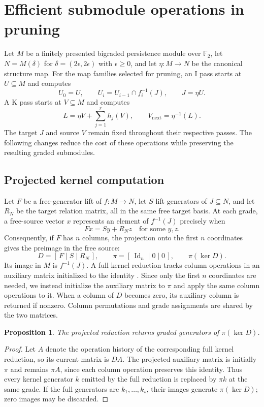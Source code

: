 \documentclass[11pt,a4paper]{article}
\newtheorem{proposition}{Proposition}
\newcommand{\F}{\mathbb F_2}
\newcommand{\Id}{\operatorname{Id}}
\begin{document}
\section{Efficient submodule operations in pruning}
Let $M$ be a finitely presented bigraded persistence module over $\F$, let
$N=M(\delta)$ for $\delta=(2\epsilon,2\epsilon)$ with $\epsilon\ge0$, and let $\eta:M\to N$
be the canonical structure map. For the map families selected for pruning,
an I pass starts at $U\subseteq M$ and computes
\[
 U_0=U,\qquad U_i=U_{i-1}\cap f_i^{-1}(J),\qquad J=\eta U.
\]
A K pass starts at $V\subseteq M$ and computes
\[
 L=\eta V+\sum_{j=1}^{r}h_j(V),\qquad V_{\mathrm{next}}=\eta^{-1}(L).
\]
The target $J$ and source $V$ remain fixed throughout their respective
passes. The following changes reduce the cost of these operations while
preserving the resulting graded submodules.

\subsection{Projected kernel computation}
Let $F$ be a free-generator lift of $f:M\to N$, let $S$ lift generators
of $J\subseteq N$, and let $R_N$ be the target relation matrix, all in the
same free target basis. At each grade, a free-source vector $x$ represents
an element of $f^{-1}(J)$ precisely when
\[
 Fx=Sy+R_Nz
 \quad\text{for some }y,z.
\]
Consequently, if $F$ has $n$ columns, the projection onto the first $n$
coordinates gives the preimage in the free source:
\begin{equation}\label{eq:projection}
 D=[\,F\mid S\mid R_N\,],\qquad
 \pi=[\,\Id_n\mid0\mid0\,],\qquad \pi(\ker D).
\end{equation}
Its image in $M$ is $f^{-1}(J)$. A full kernel reduction tracks column
operations in an auxiliary matrix initialized to the identity
\cite[Section~3]{mpfree}. Since only the first $n$ coordinates are needed,
we instead initialize the auxiliary matrix to $\pi$ and apply the same
column operations to it. When a column of $D$ becomes zero, its auxiliary
column is returned if nonzero. Column permutations and grade assignments
are shared by the two matrices.

\begin{proposition}
The projected reduction returns graded generators of $\pi(\ker D)$.
\end{proposition}
\begin{proof}
Let $A$ denote the operation history of the corresponding full kernel
reduction, so its current matrix is $DA$. The projected auxiliary matrix
is initially $\pi$ and remains $\pi A$, since each column operation
preserves this identity. Thus every kernel generator $k$ emitted by the
full reduction is replaced by $\pi k$ at the same grade. If the full
generators are $k_1,\ldots,k_s$, their images generate $\pi(\ker D)$;
zero images may be discarded.
\end{proof}
\end{document}
